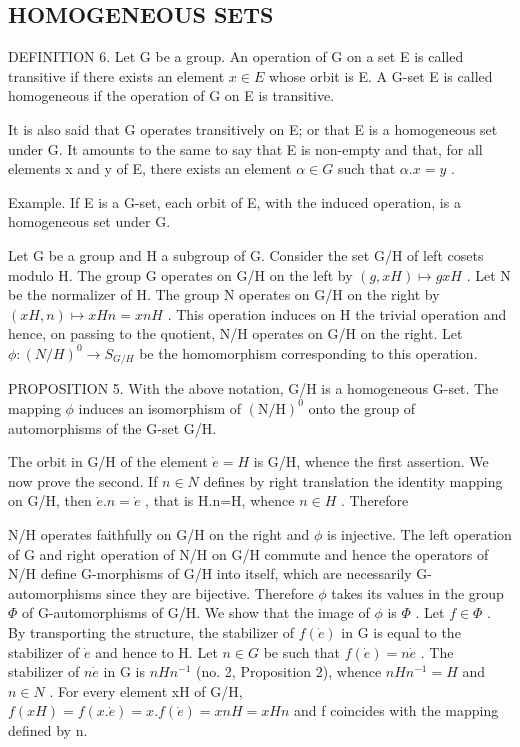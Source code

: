 \subsection{HOMOGENEOUS SETS}

DEFINITION 6. Let G be a group. An operation of G on a set E is called transitive if there exists an element \(x \in E\) whose orbit is E. A G-set E is called homogeneous if the operation of G on E is transitive.

It is also said that G operates transitively on E; or that E is a homogeneous set under G. It amounts to the same to say that E is non-empty and that, for all elements x and y of E, there exists an element \(\alpha \in G\) such that \(\alpha.x = y\) .

Example. If E is a G-set, each orbit of E, with the induced operation, is a homogeneous set under G.

Let G be a group and H a subgroup of G. Consider the set G/H of left cosets modulo H. The group G operates on G/H on the left by \((g, xH) \mapsto gxH\) . Let N be the normalizer of H. The group N operates on G/H on the right by \((xH, n) \mapsto xHn = xnH\) . This operation induces on H the trivial operation and hence, on passing to the quotient, N/H operates on G/H on the right. Let \(\phi: (N/H)^{0} \to S_{G/H}\) be the homomorphism corresponding to this operation.

PROPOSITION 5. With the above notation, G/H is a homogeneous G-set. The mapping \(\phi\) induces an isomorphism of \((\mathrm{N} / \mathrm{H})^0\) onto the group of automorphisms of the G-set G/H.

The orbit in G/H of the element \(\dot{e}=H\) is G/H, whence the first assertion. We now prove the second. If \(n\in N\) defines by right translation the identity mapping on G/H, then \(\dot{e}.n=\dot{e}\) , that is H.n=H, whence \(n\in H\) . Therefore

N/H operates faithfully on G/H on the right and \(\phi\) is injective. The left operation of G and right operation of N/H on G/H commute and hence the operators of N/H define G-morphisms of G/H into itself, which are necessarily G-automorphisms since they are bijective. Therefore \(\phi\) takes its values in the group \(\Phi\) of G-automorphisms of G/H. We show that the image of \(\phi\) is \(\Phi\) . Let \(f \in \Phi\) . By transporting the structure, the stabilizer of \(f(\dot{e})\) in G is equal to the stabilizer of \(\dot{e}\) and hence to H. Let \(n \in G\) be such that \(f(\dot{e}) = n\dot{e}\) . The stabilizer of \(n\dot{e}\) in G is \(nHn^{-1}\) (no. 2, Proposition 2), whence \(nHn^{-1} = H\) and \(n \in N\) . For every element xH of G/H, \(f(xH) = f(x.\dot{e}) = x.f(\dot{e}) = xnH = xHn\) and f coincides with the mapping defined by n.

